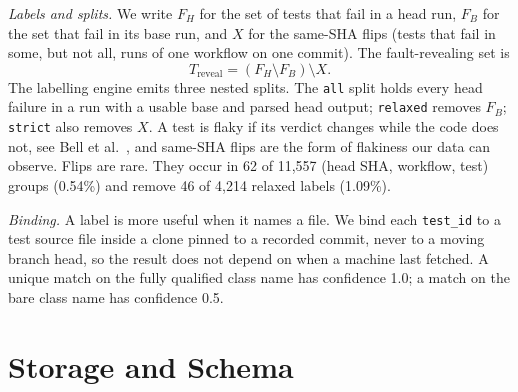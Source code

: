 \documentclass[10pt,conference]{IEEEtran}
\begin{document}
\textit{Labels and splits.} We write $F_H$ for the set of tests that fail in a head run, $F_B$ for the set that fail in its base run, and $X$ for the same-SHA flips (tests that fail in some, but not all, runs of one workflow on one commit). The fault-revealing set is
\begin{equation}
T_{\text{reveal}} = (F_H \setminus F_B) \setminus X .
\end{equation}
The labelling engine emits three nested splits. The \texttt{all} split holds every head failure in a run with a usable base and parsed head output; \texttt{relaxed} removes $F_B$; \texttt{strict} also removes $X$. A test is flaky if its verdict changes while the code does not, see Bell et al.~\cite{bell2018deflaker}, and same-SHA flips are the form of flakiness our data can observe. Flips are rare. They occur in 62 of 11,557 (head SHA, workflow, test) groups (0.54\%) and remove 46 of 4,214 relaxed labels (1.09\%).

\textit{Binding.} A label is more useful when it names a file. We bind each \texttt{test\_id} to a test source file inside a clone pinned to a recorded commit, never to a moving branch head, so the result does not depend on when a machine last fetched. A unique match on the fully qualified class name has confidence 1.0; a match on the bare class name has confidence 0.5.

\section{Storage and Schema}
\label{sec:schema}
\end{document}
